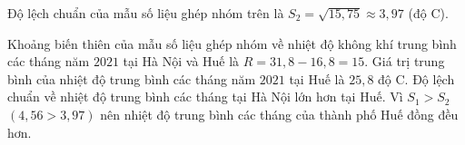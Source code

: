 \begin{ex}[Mức độ 3]
{\begin{itemize}
\begin{itemize}
				Độ lệch chuẩn của mẫu số liệu ghép nhóm trên là $S_2 = \sqrt{15{,}75} \approx 3{,}97$ (độ C).
			\end{itemize}
		\end{itemize}
		\begin{itemchoice}
			\itemch Khoảng biến thiên của mẫu số liệu ghép nhóm về nhiệt độ không khí trung bình các tháng năm $2021$ tại Hà Nội và Huế là $R = 31{,}8 - 16{,}8 = 15$.
			\itemch Giá trị trung bình của nhiệt độ trung bình các tháng năm $2021$ tại Huế là $25{,}8$ độ C.
			\itemch Độ lệch chuẩn về nhiệt độ trung bình các tháng tại Hà Nội lớn hơn tại Huế.
			\itemch Vì $S_1 > S_2$ $(4{,}56 > 3{,}97)$ nên nhiệt độ trung bình các tháng của thành phố Huế đồng đều hơn.
		\end{itemchoice}
	}
\end{ex}

